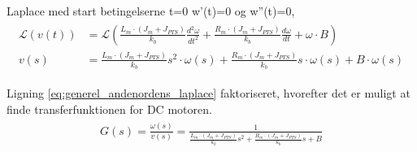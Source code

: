 Laplace med start betingelserne t=0 w'(t)=0 og w''(t)=0,
\begin{align}
\begin{split}
\mathcal{L}\left( v\left( t \right)  \right) &=\mathcal{L}\left( \frac { { L }_{ m }\cdot \left( { J }_{ m }+{ J }_{ PTS } \right)  }{ { k }_{ b } } \frac { { d }^{ 2 }\omega  }{ { dt }^{ 2 } } +\frac { { R }_{ m }\cdot \left( { J }_{ m }+{ J }_{ PTS } \right)  }{ { k }_{ b } } \frac { d\omega  }{ dt } +\omega \cdot B \right) 
\\
v\left( s \right) &=\frac { { L }_{ m }\cdot \left( { J }_{ m }+{ J }_{ PTS } \right)  }{ { k }_{ b } } { s }^{ 2 }\cdot \omega \left( s \right) +\frac { { R }_{ m }\cdot \left( { J }_{ m }+{ J }_{ PTS } \right)  }{ { k }_{ b } } { s }\cdot \omega \left( s \right) +B\cdot \omega \left( s \right) 
\label{eq:generel_andenordens_laplace}
\end{split}
\end{align}



Ligning \ref{eq:generel_andenordens_laplace} faktoriseret, hvorefter det er muligt at finde transferfunktionen for DC motoren. 
\begin{align}
\begin{split}
G\left( s \right) =\frac { \omega \left( s \right)  }{ v\left( s \right)  } =\frac { 1 }{ \frac { { L }_{ m }\cdot \left( { J }_{ m }+{ J }_{ PTS } \right)  }{ { k }_{ b } } { s }^{ 2 }+\frac { { R }_{ m }\cdot \left( { J }_{ m }+{ J }_{ PTS } \right)  }{ { k }_{ b } } s+B } 
\label{eq:generel_tf}
\end{split}
\end{align}

